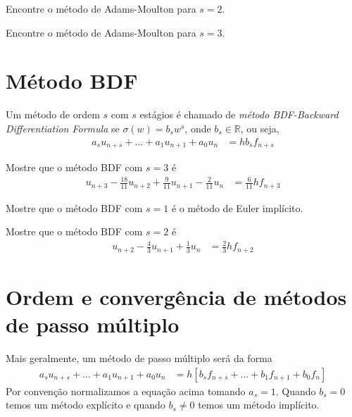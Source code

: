 \begin{exer}
Encontre o método de Adams-Moulton para $s=2$.
\end{exer}

\begin{exer}
Encontre o método de Adams-Moulton para $s=3$.
\end{exer}


\section{Método BDF}
Um método de ordem $s$ com $s$ estágios é chamado de \emph{método BDF-Backward Differentiation Formula} se $\sigma (w)=b_sw^s$, onde $b_s \in \mathbb{R}$, ou seja,
\begin{eqnarray}\label{BDF}
  a_s u_{n+s}+ ...+ a_1 u_{n+1} + a_0u_{n} &=  h b_sf_{n+s}
\end{eqnarray}

\begin{ex}
Mostre que o método BDF com $s=3$ é
\begin{eqnarray}
  u_{n+3} -\frac{18}{11} u_{n+2}+\frac{9}{11}u_{n+1}-\frac{2}{11}u_n &= \frac{6}{11}h f_{n+3}
\end{eqnarray}
\end{ex}



\begin{exer}
Mostre que o método BDF com $s=1$ é o método de Euler implícito.
\end{exer}

\begin{exer}
Mostre que o método BDF com $s=2$ é
\begin{eqnarray}
  u_{n+2} -\frac{4}{3} u_{n+1} + \frac{1}{3}u_n &= \frac{2}{3}h f_{n+2}
\end{eqnarray}
\end{exer}


\section{Ordem e convergência de métodos de passo múltiplo}
Mais geralmente, um método de passo múltiplo será da forma
\begin{eqnarray}\label{multistep}
  a_s u_{n+s}+ ...+ a_1 u_{n+1} + a_0u_{n} &=  h [b_sf_{n+s} +... +b_1f_{n+1} +b_0f_n]
\end{eqnarray}
Por convenção normalizamos a equação acima tomando $a_s=1$. Quando $b_s=0$ temos um método explícito e quando $b_s \neq 0$ temos um método implícito.

